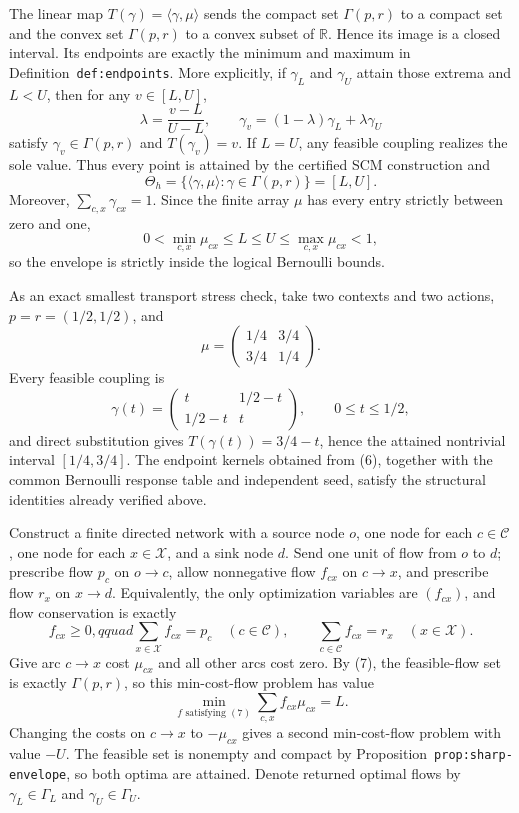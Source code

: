The linear map \(T(\gamma)=\langle\gamma,\mu\rangle\) sends the compact set \(\Gamma(p,r)\) to a compact set and the convex set \(\Gamma(p,r)\) to a convex subset of \(\mathbb R\).  Hence its image is a closed interval.  Its endpoints are exactly the minimum and maximum in Definition~\texttt{def:endpoints}.  More explicitly, if \(\gamma_L\) and \(\gamma_U\) attain those extrema and \(L<U\), then for any \(v\in[L,U]\),
\[
\lambda=\frac{v-L}{U-L},\qquad
\gamma_v=(1-\lambda)\gamma_L+\lambda\gamma_U
\]
satisfy \(\gamma_v\in\Gamma(p,r)\) and \(T(\gamma_v)=v\).  If \(L=U\), any feasible coupling realizes the sole value.  Thus every point is attained by the certified SCM construction and
\[
\Theta_h=\{\langle\gamma,\mu\rangle:\gamma\in\Gamma(p,r)\}=[L,U].
\]
Moreover, \(\sum_{c,x}\gamma_{cx}=1\).  Since the finite array \(\mu\) has every entry strictly between zero and one,
\[
0<\min_{c,x}\mu_{cx}\leq L\leq U\leq\max_{c,x}\mu_{cx}<1,
\]
so the envelope is strictly inside the logical Bernoulli bounds.

As an exact smallest transport stress check, take two contexts and two actions, \(p=r=(1/2,1/2)\), and
\[
\mu=\begin{pmatrix}1/4&3/4\\3/4&1/4\end{pmatrix}.
\]
Every feasible coupling is
\[
\gamma(t)=\begin{pmatrix}t&1/2-t\\1/2-t&t\end{pmatrix},
\qquad 0\leq t\leq1/2,
\]
and direct substitution gives \(T(\gamma(t))=3/4-t\), hence the attained nontrivial interval \([1/4,3/4]\).  The endpoint kernels obtained from (6), together with the common Bernoulli response table and independent seed, satisfy the structural identities already verified above.

Construct a finite directed network with a source node \(o\), one node for each \(c\in\mathcal C\), one node for each \(x\in\mathcal X\), and a sink node \(d\).  Send one unit of flow from \(o\) to \(d\); prescribe flow \(p_c\) on \(o\to c\), allow nonnegative flow \(f_{cx}\) on \(c\to x\), and prescribe flow \(r_x\) on \(x\to d\).  Equivalently, the only optimization variables are \((f_{cx})\), and flow conservation is exactly
\[
f_{cx}\geq0,qquad
\sum_{x\in\mathcal X}f_{cx}=p_c\quad(c\in\mathcal C),
\qquad
\sum_{c\in\mathcal C}f_{cx}=r_x\quad(x\in\mathcal X).
\tag{7}
\]
Give arc \(c\to x\) cost \(\mu_{cx}\) and all other arcs cost zero.  By (7), the feasible-flow set is exactly \(\Gamma(p,r)\), so this min-cost-flow problem has value
\[
\min_{f\text{ satisfying }(7)}\sum_{c,x}f_{cx}\mu_{cx}=L.
\]
Changing the costs on \(c\to x\) to \(-\mu_{cx}\) gives a second min-cost-flow problem with value \(-U\).  The feasible set is nonempty and compact by Proposition~\texttt{prop:sharp-envelope}, so both optima are attained.  Denote returned optimal flows by \(\gamma_L\in\Gamma_L\) and \(\gamma_U\in\Gamma_U\).

